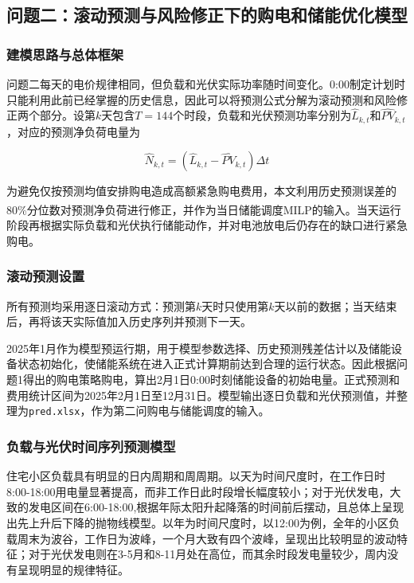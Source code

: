 \documentclass[UTF8]{ctexart}
\let\oldcite\cite
\renewcommand{\cite}[1]{\textsuperscript{\oldcite{#1}}}
\begin{document}
    \subsection{问题二：滚动预测与风险修正下的购电和储能优化模型}
    
    \subsubsection{建模思路与总体框架}
    
    问题二每天的电价规律相同，但负载和光伏实际功率随时间变化。0:00制定计划时只能利用此前已经掌握的历史信息，因此可以将预测公式分解为滚动预测和风险修正两个部分。设第$k$天包含$T=144$个时段，负载和光伏预测功率分别为$\widehat L_{k,t}$和$\widehat{PV}_{k,t}$，对应的预测净负荷电量为
    
    \begin{equation}
        \widehat N_{k,t}
        =\left(\widehat L_{k,t}-\widehat{PV}_{k,t}\right)\Delta t
    \end{equation}
    
    为避免仅按预测均值安排购电造成高额紧急购电费用，本文利用历史预测误差的80\%分位数对预测净负荷进行修正，并作为当日储能调度MILP的输入\cite{HONG2016914}。当天运行阶段再根据实际负载和光伏执行储能动作，并对电池放电后仍存在的缺口进行紧急购电。\par
    
    \subsubsection{滚动预测设置}
    
    所有预测均采用逐日滚动方式：预测第$k$天时只使用第$k$天以前的数据；当天结束后，再将该天实际值加入历史序列并预测下一天。\par
    
    2025年1月作为模型预运行期，用于模型参数选择、历史预测残差估计以及储能设备状态初始化，使储能系统在进入正式计算期前达到合理的运行状态。因此根据问题1得出的购电策略购电，算出2月1日0:00时刻储能设备的初始电量。正式预测和费用统计区间为2025年2月1日至12月31日。模型输出逐日负载和光伏预测值，并整理为\texttt{pred.xlsx}，作为第二问购电与储能调度的输入。\par
    
    \subsubsection{负载与光伏时间序列预测模型}
    
    住宅小区负载具有明显的日内周期和周周期。以天为时间尺度时，在工作日时8:00-18:00用电量显著提高，而非工作日此时段增长幅度较小；对于光伏发电，大致的发电区间在6:00-18:00,根据年际太阳升起降落的时间前后摆动，且总体上呈现出先上升后下降的抛物线模型。以年为时间尺度时，以12:00为例，全年的小区负载周末为波谷，工作日为波峰，一个月大致有四个波峰，呈现出比较明显的波动特征；对于光伏发电则在3-5月和8-11月处在高位，而其余时段发电量较少，周内没有呈现明显的规律特征。\par
    
\end{document}
